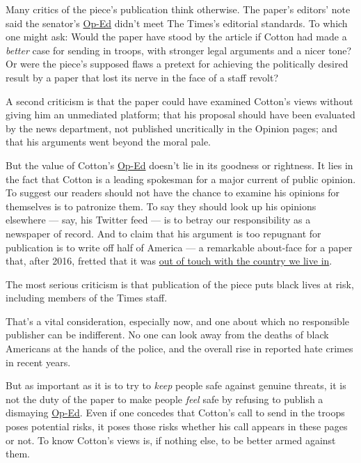 Many critics of the piece's publication think otherwise. The paper's
editors' note said the senator's
\href{https://www.nytimes3xbfgragh.onion/2020/06/03/opinion/tom-cotton-protests-military.html}{Op-Ed}
didn't meet The Times's editorial standards. To which one might ask:
Would the paper have stood by the article if Cotton had made a
\emph{better} case for sending in troops, with stronger legal arguments
and a nicer tone? Or were the piece's supposed flaws a pretext for
achieving the politically desired result by a paper that lost its nerve
in the face of a staff revolt?

A second criticism is that the paper could have examined Cotton's views
without giving him an unmediated platform; that his proposal should have
been evaluated by the news department, not published uncritically in the
Opinion pages; and that his arguments went beyond the moral pale.

But the value of Cotton's
\href{https://www.nytimes3xbfgragh.onion/2020/06/03/opinion/tom-cotton-protests-military.html}{Op-Ed}
doesn't lie in its goodness or rightness. It lies in the fact that
Cotton is a leading spokesman for a major current of public opinion. To
suggest our readers should not have the chance to examine his opinions
for themselves is to patronize them. To say they should look up his
opinions elsewhere --- say, his Twitter feed --- is to betray our
responsibility as a newspaper of record. And to claim that his argument
is too repugnant for publication is to write off half of America --- a
remarkable about-face for a paper that, after 2016, fretted that it was
\href{https://www.nytimes3xbfgragh.onion/2020/01/31/podcasts/the-daily/2020-election.html}{out
of touch with the country we live in}.

The most serious criticism is that publication of the piece puts black
lives at risk, including members of the Times staff.

That's a vital consideration, especially now, and one about which no
responsible publisher can be indifferent. No one can look away from the
deaths of black Americans at the hands of the police, and the overall
rise in reported hate crimes in recent years.

But as important as it is to try to \emph{keep} people safe against
genuine threats, it is not the duty of the paper to make people
\emph{feel} safe by refusing to publish a dismaying
\href{https://www.nytimes3xbfgragh.onion/2020/06/03/opinion/tom-cotton-protests-military.html}{Op-Ed}.
Even if one concedes that Cotton's call to send in the troops poses
potential risks, it poses those risks whether his call appears in these
pages or not. To know Cotton's views is, if nothing else, to be better
armed against them.

